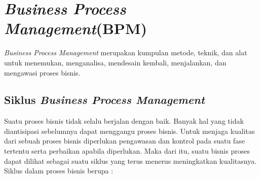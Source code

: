 \section{\textit{Business Process Management}(BPM)}
\label{sec:bpm}
\textit{Business Process Management} merupakan kumpulan metode, teknik, dan alat untuk menemukan, menganalisa, mendesain kembali, menjalankan, dan mengawasi proses bisnis. 
\subsection{Siklus \textit{Business Process Management}}
\label{sec:siklusBPM}
Suatu proses bisnis tidak selalu berjalan dengan baik. Banyak hal yang tidak diantisipasi sebelumnya dapat menggangu proses bisnis. Untuk menjaga kualitas dari sebuah proses bisnis diperlukan pengawasan dan kontrol pada suatu fase tertentu serta perbaikan apabila diperlukan. Maka dari itu, suatu bisnis proses dapat dilihat sebagai suatu siklus yang terus menerus meningkatkan kualitasnya. Siklus dalam proses bisnis berupa :

